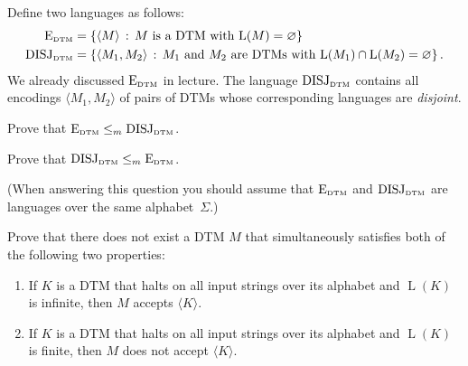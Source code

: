 \documentclass[11pt]{article}
\newcommand{\op}[1]{\operatorname{#1}}
\newenvironment{mylist}[1]{\begin{list}{}{
	\setlength{\leftmargin}{#1}
	\setlength{\rightmargin}{0mm}
	\setlength{\labelsep}{2mm}
	\setlength{\labelwidth}{8mm}
	\setlength{\itemsep}{0mm}}}
	{\end{list}}
\newcounter{questioncounter}
\newenvironment{question}{
  \begin{mylist}{\parindent}
  \item[\stepcounter{questioncounter}
    \thequestioncounter.]}{
\end{mylist}}
\begin{document}
\begin{question}[6 points]
  Define two languages as follows:
  \begin{align*}
    \textup{E}_{\textup{\tiny DTM}} & = 
    \left\{\langle M \rangle\,:\,
    \text{$M$ is a DTM with $\op{L}(M)=\varnothing$}\right\}\\
    \textup{DISJ}_{\textup{\tiny DTM}} & = 
    \left\{\langle M_1,M_2 \rangle\,:\,
    \text{$M_1$ and $M_2$ are DTMs with 
      $\op{L}(M_1)\cap\op{L}(M_2)=\varnothing$}\right\}.
  \end{align*}
  We already discussed $\textup{E}_{\textup{\tiny DTM}}$ in lecture.
  The language $\textup{DISJ}_{\textup{\tiny DTM}}$ contains all
  encodings $\langle M_1,M_2\rangle$ of pairs of DTMs whose
  corresponding languages are \emph{disjoint}.

  \begin{mylist}{8mm}
  \item[(a)] Prove that 
    $\textup{E}_{\textup{\tiny DTM}} \leq_m
    \textup{DISJ}_{\textup{\tiny DTM}}$.
  \item[(b)] Prove that 
    $\textup{DISJ}_{\textup{\tiny DTM}}
    \leq_m
    \textup{E}_{\textup{\tiny DTM}}$.
  \end{mylist}

  (When answering this question you should assume that
  $\textup{E}_{\textup{\tiny DTM}}$ and $\textup{DISJ}_{\textup{\tiny DTM}}$
  are languages over the same alphabet~$\Sigma$.)
\end{question}


\begin{question}[4 points]
  Prove that there does not exist a DTM $M$ that simultaneously satisfies both
  of the following two properties:
  \begin{enumerate}
  \item[(i)]
    If $K$ is a DTM that halts on all input strings over its alphabet and
    $\op{L}(K)$ is infinite, then $M$ accepts $\langle K\rangle$.
  \item[(ii)]
    If $K$ is a DTM that halts on all input strings over its alphabet and
    $\op{L}(K)$ is finite, then $M$ does not accept $\langle K\rangle$.
  \end{enumerate}
\end{question}

\end{document}
